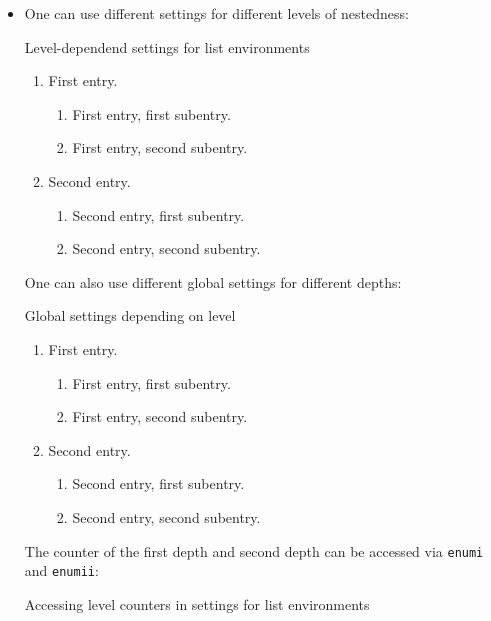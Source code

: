 \begin{itemize}
  \item
    One can use different settings for different levels of nestedness:
    \begin{showlatex}{Level-dependend settings for list environments}
\begin{enumerate}[label = \Roman*]
  \item
    First entry.
    \begin{enumerate}[label = \alph*]
      \item
        First entry, first subentry.
      \item
        First entry, second subentry.
    \end{enumerate}
  \item
    Second entry.
    \begin{enumerate}[label = \arabic*]
      \item
        Second entry, first subentry.
      \item
        Second entry, second subentry.
    \end{enumerate}
\end{enumerate}
    \end{showlatex}
    One can also use different global settings for different depths:
    \begin{showlatex}{Global settings depending on level}
\begin{enumerate}
  \item
    First entry.
    \begin{enumerate}
      \item
        First entry, first subentry.
      \item
        First entry, second subentry.
    \end{enumerate}
  \item
    Second entry.
    \begin{enumerate}
      \item
        Second entry, first subentry.
      \item
        Second entry, second subentry.
    \end{enumerate}
\end{enumerate}
    \end{showlatex}
    The counter of the first depth and second depth can be accessed via \texttt{enumi} and \texttt{enumii}: 
    \begin{showlatex}{Accessing level counters in settings for list environments}

\end{showlatex}
\end{itemize}
